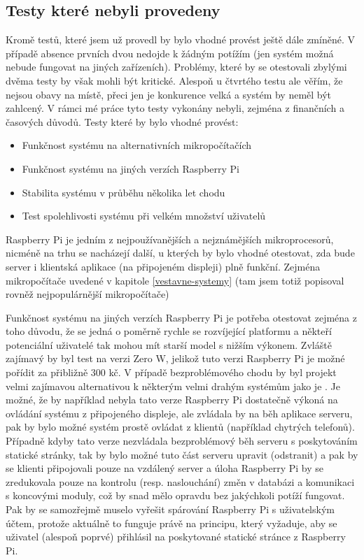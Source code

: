 \subsection*{Testy které nebyli provedeny}
Kromě testů, které jsem už provedl by bylo vhodné provést ještě dále zmíněné. V případě absence prvních dvou nedojde k žádným potížím (jen systém možná nebude fungovat na jiných zařízeních). Problémy, které by se otestovali zbylými dvěma testy by však mohli být kritické. Alespoň u čtvrtého testu ale věřím, že nejsou obavy na místě, přeci jen je konkurence velká a systém by neměl být zahlcený. V rámci mé práce tyto testy vykonány nebyli, zejména z finančních a časových důvodů.
Testy které by bylo vhodné provést:
\begin{itemize}
    \item Funkčnost systému na alternativních mikropočítačích 
    \item Funkčnost systému na jiných verzích Raspberry Pi
    \item Stabilita systému v průběhu několika let chodu
    \item Test spolehlivosti systému při velkém množství uživatelů
\end{itemize}
Raspberry Pi je jedním z nejpoužívanějších a nejznámějších mikroprocesorů, nicméně na trhu se nacházejí další, u kterých by bylo vhodné otestovat, zda bude server i klientská aplikace (na připojeném displeji) plně funkční. Zejména mikropočítače uvedené v kapitole \ref{vestavne-systemy} (tam jsem totiž popisoval rovněž nejpopulárnější mikropočítače)

Funkčnost systému na jiných verzích Raspberry Pi je potřeba otestovat zejména z toho důvodu, že se jedná o poměrně rychle se rozvíjející platformu a někteří potenciální uživatelé tak mohou mít starší model s nižším výkonem. Zvláště zajímavý by byl test na verzi Zero W, jelikož tuto verzi Raspberry Pi je možné pořídit za přibližně 300 kč. V případě bezproblémového chodu by byl projekt velmi zajímavou alternativou k některým velmi drahým systémům jako je . Je možné, že by například nebyla tato verze Raspberry Pi dostatečně výkoná na ovládání systému z připojeného displeje, ale zvládala by na běh aplikace serveru, pak by bylo možné systém prostě ovládat z klientů (například chytrých telefonů). Případně kdyby tato verze nezvládala bezproblémový běh serveru s poskytováním statické stránky, tak by bylo možné tuto část serveru upravit (odstranit) a pak by se klienti připojovali pouze na vzdálený server a úloha Raspberry Pi by se zredukovala pouze na kontrolu (resp. naslouchání) změn v databázi a komunikaci s koncovými moduly, což by snad mělo opravdu bez jakýchkoli potíží fungovat. Pak by se samozřejmě muselo vyřešit spárování Raspberry Pi s uživatelským účtem, protože aktuálně to funguje právě na principu, který vyžaduje, aby se uživatel (alespoň poprvé) přihlásil na poskytované statické stránce z Raspberry Pi.

